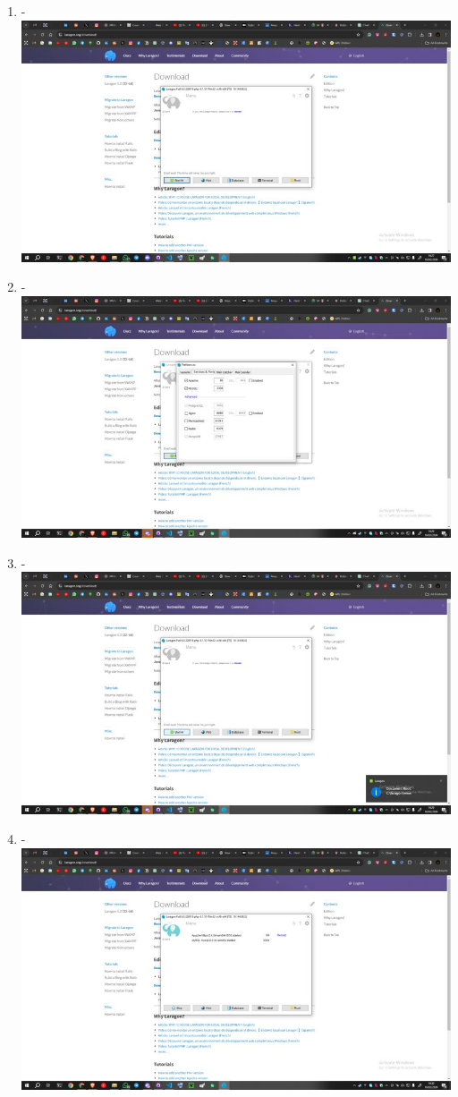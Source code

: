 \documentclass[12pt,titlepage]{article}
\begin{document}
\begin{enumerate}[label= \alph*.]
    \newpage
    \item - \\ \includegraphics[width=.9\textwidth]{images/figures/Laragon 9.jpg}
    \item - \\ \includegraphics[width=.9\textwidth]{images/figures/Laragon 10.jpg}
    \newpage
    \item - \\ \includegraphics[width=.9\textwidth]{images/figures/Laragon 11.jpg}
    \item - \\ \includegraphics[width=.9\textwidth]{images/figures/Laragon 12.jpg}

\end{enumerate}
\end{document}

